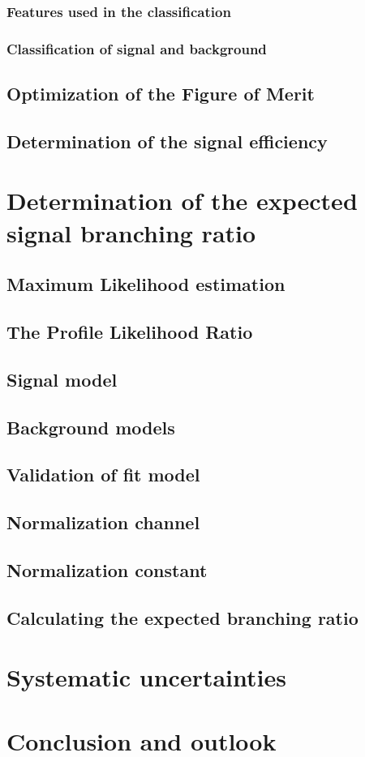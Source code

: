 \subsection{Features used in the classification}
\subsection{Classification of signal and background}

\section{Optimization of the Figure of Merit}

\section{Determination of the signal efficiency}

\chapter{Determination of the expected signal branching ratio}

\section{Maximum Likelihood estimation}

\section{The Profile Likelihood Ratio}

\section{Signal model}

\section{Background models}

\section{Validation of fit model}

\section{Normalization channel}

\section{Normalization constant}

\section{Calculating the expected branching ratio}

\chapter{Systematic uncertainties}

\chapter{Conclusion and outlook}


